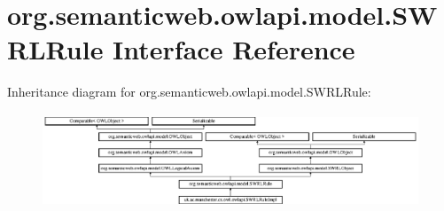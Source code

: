 \hypertarget{interfaceorg_1_1semanticweb_1_1owlapi_1_1model_1_1_s_w_r_l_rule}{\section{org.\-semanticweb.\-owlapi.\-model.\-S\-W\-R\-L\-Rule Interface Reference}
\label{interfaceorg_1_1semanticweb_1_1owlapi_1_1model_1_1_s_w_r_l_rule}
}
Inheritance diagram for org.\-semanticweb.\-owlapi.\-model.\-S\-W\-R\-L\-Rule\-:\begin{figure}[H]
\begin{center}
\leavevmode
\includegraphics[height=2.809365cm]{interfaceorg_1_1semanticweb_1_1owlapi_1_1model_1_1_s_w_r_l_rule}
\end{center}
\end{figure}
